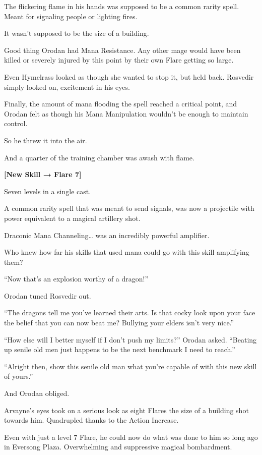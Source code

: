 \documentclass[a4paper,10pt]{book}
\begin{document}
The flickering flame in his hands was supposed to be a common rarity spell. Meant for signaling people or lighting fires.\par
It wasn’t supposed to be the size of a building.\par
Good thing Orodan had Mana Resistance. Any other mage would have been killed or severely injured by this point by their own Flare getting so large.\par
Even Hymelrass looked as though she wanted to stop it, but held back. Rosvedir simply looked on, excitement in his eyes.\par
Finally, the amount of mana flooding the spell reached a critical point, and Orodan felt as though his Mana Manipulation wouldn’t be enough to maintain control.\par
So he threw it into the air.\par
And a quarter of the training chamber was awash with flame.\par
\textbf{[New Skill → Flare 7]}\par
Seven levels in a single cast.\par
A common rarity spell that was meant to send signals, was now a projectile with power equivalent to a magical artillery shot.\par
Draconic Mana Channeling… was an incredibly powerful amplifier.\par
Who knew how far his skills that used mana could go with this skill amplifying them?\par
“Now that’s an explosion worthy of a dragon!”\par
Orodan tuned Rosvedir out.\par
\par
“The dragons tell me you’ve learned their arts. Is that cocky look upon your face the belief that you can now beat me? Bullying your elders isn’t very nice.”\par
“How else will I better myself if I don’t push my limits?” Orodan asked. “Beating up senile old men just happens to be the next benchmark I need to reach.”\par
“Alright then, show this senile old man what you’re capable of with this new skill of yours.”\par
And Orodan obliged.\par
Arvayne’s eyes took on a serious look as eight Flares the size of a building shot towards him. Quadrupled thanks to the Action Increase.\par
Even with just a level 7 Flare, he could now do what was done to him so long ago in Eversong Plaza. Overwhelming and suppressive magical bombardment.\par
\end{document}
